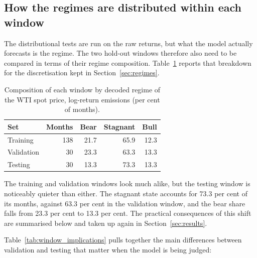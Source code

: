 \documentclass[11pt,a4paper]{article}
\begin{document}
\subsection{How the regimes are distributed within each window}

The distributional tests are run on the raw returns, but what the model actually
forecasts is the regime. The two hold-out windows therefore also need to be compared
in terms of their regime composition. Table~\ref{tab:shares} reports that breakdown
for the discretisation kept in Section~\ref{sec:regimes}.

\begin{table}[H]
\centering
\caption{Composition of each window by decoded regime of the WTI spot price, log-return emissions
(per cent of months).}
\label{tab:shares}
\begin{tabular}{@{}lrrrr@{}}
\toprule
\textbf{Set} & \textbf{Months} & \textbf{Bear} & \textbf{Stagnant} & \textbf{Bull} \\
\midrule
Training   & 138 & 21.7 & 65.9 & 12.3 \\
Validation &  30 & 23.3 & 63.3 & 13.3 \\
Testing    &  30 & 13.3 & 73.3 & 13.3 \\
\bottomrule
\end{tabular}
\end{table}

The training and validation windows look much alike, but the testing window is noticeably quieter
than either. The stagnant state accounts for 73.3 per cent of its months, against 63.3 per cent
in the validation window, and the bear share falls from 23.3 per cent to 13.3 per cent. The
practical consequences of this shift are summarised below and taken up again in
Section~\ref{sec:results}.

Table~\ref{tab:window_implications} pulls together the main differences between validation and
testing that matter when the model is being judged:
\end{document}
